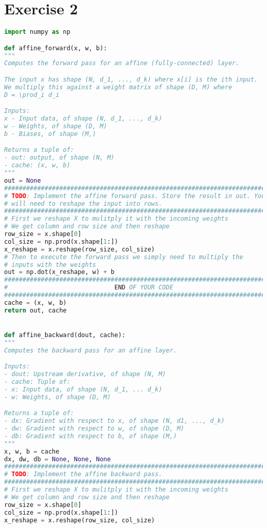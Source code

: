 \chapter{Exercise 2}






\begin{lstlisting}[language=Python, label=lst:layers.py, caption={layers.py}, basicstyle=\tiny]
import numpy as np

def affine_forward(x, w, b):
"""
Computes the forward pass for an affine (fully-connected) layer.

The input x has shape (N, d_1, ..., d_k) where x[i] is the ith input.
We multiply this against a weight matrix of shape (D, M) where
D = \prod_i d_i

Inputs:
x - Input data, of shape (N, d_1, ..., d_k)
w - Weights, of shape (D, M)
b - Biases, of shape (M,)

Returns a tuple of:
- out: output, of shape (N, M)
- cache: (x, w, b)
"""
out = None
#############################################################################
# TODO: Implement the affine forward pass. Store the result in out. You     #
# will need to reshape the input into rows.                                 #
#############################################################################
# First we reshape X to mulitply it with the incoming weights
# We get column and row size and then reshape
row_size = x.shape[0]
col_size = np.prod(x.shape[1:])
x_reshape = x.reshape(row_size, col_size)
# Then to execute the forward pass we simply need to multiply the
# inputs with the weights
out = np.dot(x_reshape, w) + b
#############################################################################
#                             END OF YOUR CODE                              #
#############################################################################
cache = (x, w, b)
return out, cache


def affine_backward(dout, cache):
"""
Computes the backward pass for an affine layer.

Inputs:
- dout: Upstream derivative, of shape (N, M)
- cache: Tuple of:
- x: Input data, of shape (N, d_1, ... d_k)
- w: Weights, of shape (D, M)

Returns a tuple of:
- dx: Gradient with respect to x, of shape (N, d1, ..., d_k)
- dw: Gradient with respect to w, of shape (D, M)
- db: Gradient with respect to b, of shape (M,)
"""
x, w, b = cache
dx, dw, db = None, None, None
#############################################################################
# TODO: Implement the affine backward pass.                                 #
#############################################################################
# First we reshape X to mulitply it with the incoming weights
# We get column and row size and then reshape
row_size = x.shape[0]
col_size = np.prod(x.shape[1:])
x_reshape = x.reshape(row_size, col_size)


\end{lstlisting}
